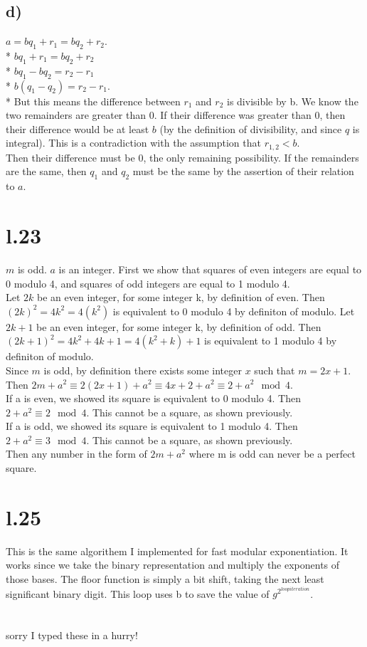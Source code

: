 \documentclass{article}
\begin{document}
\subsection{d)}
$a = bq_1 + r_1 = bq_2 + r_2$.
\\*
$bq_1 + r_1 = bq_2 + r_2$
\\*
$bq_1 - bq_2 = r_2 - r_1$
\\*
$b(q_1 - q_2) = r_2 - r_1$.
\\*
But this means the difference between $r_1$ and $r_2$ is divisible by b. We know the two remainders are greater than 0. If their difference was greater than 0, then their difference would be at least $b$ (by the definition of divisibility, and since $q$ is integral). This is a contradiction with the assumption that $r_{1,2} < b$.
\\
Then their difference must be 0, the only remaining possibility. If the remainders are the same, then $q_1$ and $q_2$ must be the same by the assertion of their relation to $a$.


\section{l.23}
$m$ is odd. $a$ is an integer.
First we show that squares of even integers are equal to 0 modulo 4, and squares of odd integers are equal to 1 modulo 4.
\\
Let $2k$ be an even integer, for some integer k, by definition of even.
Then $(2k)^2 = 4k^2 = 4(k^2)$ is equivalent to 0 modulo 4 by definiton of modulo.
Let $2k + 1$ be an even integer, for some integer k, by definition of odd.
Then $(2k + 1)^2 = 4k^2 + 4k + 1 = 4(k^2 + k) + 1$ is equivalent to 1 modulo 4 by definiton of modulo.
\\
Since $m$ is odd, by definition there exists some integer $x$ such that $m = 2x + 1$.
Then $2m + a^2 \equiv
2(2x +1) + a^2 \equiv
4x + 2 + a^2 \equiv
2 + a^2
\mod{4}$.
\\
If a is even, we showed its square is equivalent to 0 modulo 4. Then $2 + a^2 \equiv 2 \mod{4}$. This cannot be a square, as shown previously.
\\
If a is odd, we showed its square is equivalent to 1 modulo 4. Then $2 + a^2 \equiv 3 \mod{4}$. This cannot be a square, as shown previously.
\\
Then any number in the form of $2m + a^2$ where m is odd can never be a perfect square.


\section{l.25}
This is the same algorithem I implemented for fast modular exponentiation. It works since we take the binary representation and multiply the exponents of those bases. The floor function is simply a bit shift, taking the next least significant binary digit. This loop uses b to save the value of $g^{2^{loop iteration}}$.
\\\\\\
sorry I typed these in a hurry!
\end{document}

